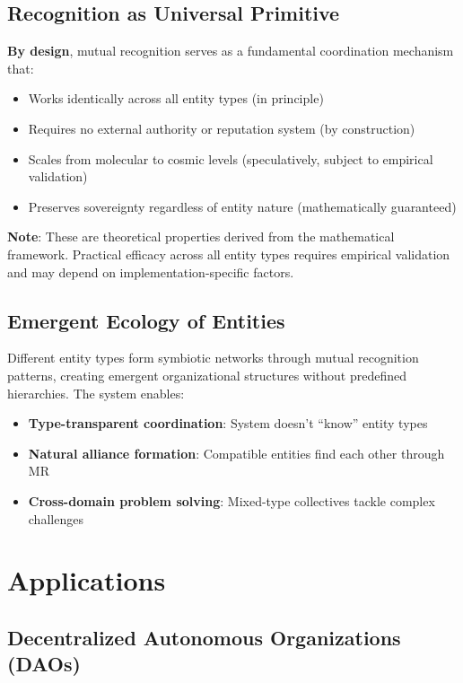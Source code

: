 \documentclass[11pt,a4paper]{article}
\theoremstyle{definition}
\theoremstyle{remark}
\begin{document}
\subsection{Recognition as Universal Primitive}

\textbf{By design}, mutual recognition serves as a fundamental coordination mechanism that:
\begin{itemize}
\item Works identically across all entity types (in principle)
\item Requires no external authority or reputation system (by construction)
\item Scales from molecular to cosmic levels (speculatively, subject to empirical validation)
\item Preserves sovereignty regardless of entity nature (mathematically guaranteed)
\end{itemize}

\textbf{Note}: These are theoretical properties derived from the mathematical framework. Practical efficacy across all entity types requires empirical validation and may depend on implementation-specific factors.

\subsection{Emergent Ecology of Entities}

Different entity types form symbiotic networks through mutual recognition patterns, creating emergent organizational structures without predefined hierarchies. The system enables:
\begin{itemize}
\item \textbf{Type-transparent coordination}: System doesn't ``know'' entity types
\item \textbf{Natural alliance formation}: Compatible entities find each other through MR
\item \textbf{Cross-domain problem solving}: Mixed-type collectives tackle complex challenges
\end{itemize}

\section{Applications}

\subsection{Decentralized Autonomous Organizations (DAOs)}
\end{document}
